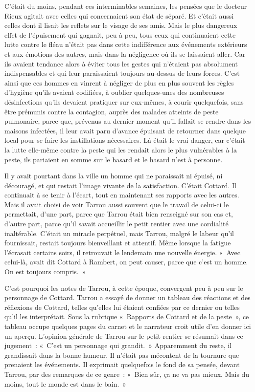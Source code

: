 \documentclass[french,twoside]{book} %
\begin{document}
C’était du moins, pendant ces interminables semaines, les pensées que le docteur Rieux agitait avec celles qui concernaient son état de séparé. Et c’était aussi celles dont il lisait les reflets sur le visage de ses amis. Mais le plus dangereux effet de l’épuisement qui gagnait, peu à peu, tous ceux qui continuaient cette lutte contre le fléau n’était pas dans cette indifférence aux événements extérieurs et aux émotions des autres, mais dans la négligence où ils se laissaient aller. Car ils avaient tendance alors à éviter tous les gestes qui n’étaient pas absolument indispensables et qui leur paraissaient toujours au-dessus de leurs forces. C’est ainsi que ces hommes en vinrent à négliger de plus en plus souvent les règles d’hygiène qu’ils avaient codifiées, à oublier quelques-unes des nombreuses désinfections qu’ils devaient pratiquer sur eux-mêmes, à courir quelquefois, sans être prémunis contre la contagion, auprès des malades atteints de peste pulmonaire, parce que, prévenus au dernier moment qu’il fallait se rendre dans les maisons infectées, il leur avait paru d’avance épuisant de retourner dans quelque local pour se faire les instillations nécessaires. Là était le vrai danger, car c’était la lutte elle-même contre la peste qui les rendait alors le plus vulnérables à la peste, ils pariaient en somme sur le hasard et le hasard n’est à personne.\par
Il y avait pourtant dans la ville un homme qui ne paraissait ni épuisé, ni découragé, et qui restait l’image vivante de la satisfaction. C’était Cottard. Il continuait à se tenir à l’écart, tout en maintenant ses rapports avec les autres. Mais il avait choisi de voir Tarrou aussi souvent que le travail de celui-ci le permettait, d’une part, parce que Tarrou était bien renseigné sur son cas et, d’autre part, parce qu’il savait accueillir le petit rentier avec une cordialité inaltérable. C’était un miracle perpétuel, mais Tarrou, malgré le labeur qu’il fournissait, restait toujours bienveillant et attentif. Même lorsque la fatigue l’écrasait certains soirs, il retrouvait le lendemain une nouvelle énergie. « Avec celui-là, avait dit Cottard à Rambert, on peut causer, parce que c’est un homme. On est toujours compris. »\par
C’est pourquoi les notes de Tarrou, à cette époque, convergent peu à peu sur le personnage de Cottard. Tarrou a essayé de donner un tableau des réactions et des réflexions de Cottard, telles qu’elles lui étaient confiées par ce dernier ou telles qu’il les interprétait. Sous la rubrique « Rapports de Cottard et de la peste », ce tableau occupe quelques pages du carnet et le narrateur croit utile d’en donner ici un aperçu. L’opinion générale de Tarrou sur le petit rentier se résumait dans ce jugement : « C’est un personnage qui grandit. » Apparemment du reste, il grandissait dans la bonne humeur. Il n’était pas mécontent de la tournure que prenaient les événements. Il exprimait quelquefois le fond de sa pensée, devant Tarrou, par des remarques de ce genre : « Bien sûr, ça ne va pas mieux. Mais du moins, tout le monde est dans le bain. »\par
\end{document}
